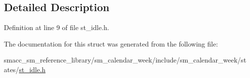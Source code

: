 \subsection{Detailed Description}


Definition at line 9 of file st\+\_\+idle.\+h.



The documentation for this struct was generated from the following file\+:\begin{DoxyCompactItemize}
\item 
smacc\+\_\+sm\+\_\+reference\+\_\+library/sm\+\_\+calendar\+\_\+week/include/sm\+\_\+calendar\+\_\+week/states/\hyperlink{sm__calendar__week_2include_2sm__calendar__week_2states_2st__idle_8h}{st\+\_\+idle.\+h}\end{DoxyCompactItemize}
